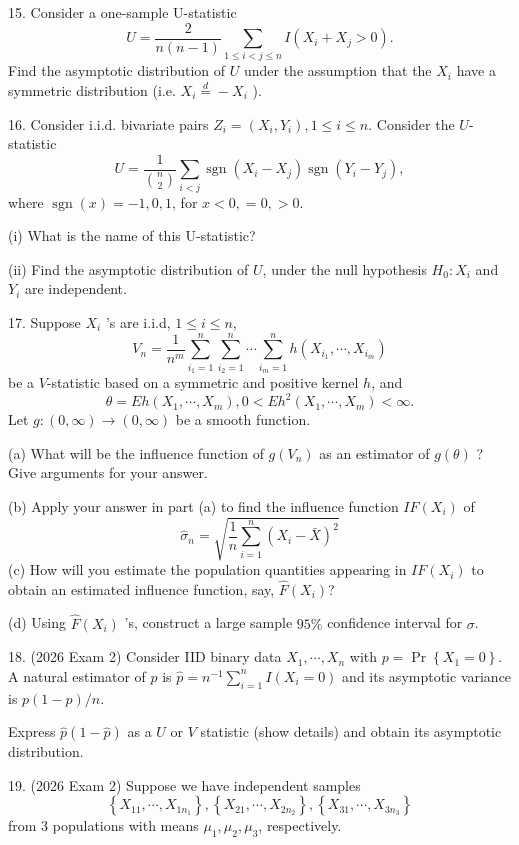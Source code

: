 \documentclass[11pt]{article}
\theoremstyle{definition}
\begin{document}
15. Consider a one-sample U-statistic
$$
U=\frac{2}{n(n-1)} \sum_{1 \leq i<j \leq n} I\left(X_i+X_j>0\right) .
$$
Find the asymptotic distribution of $U$ under the assumption that the $X_i$ have a symmetric distribution (i.e. $X_i \stackrel{d}{=}-X_i$ ).

16. Consider i.i.d. bivariate pairs $Z_i=\left(X_i, Y_i\right), 1 \leq i \leq n$. Consider the $U$-statistic
$$
U=\frac{1}{\binom{n}{2}} \sum_{i<j} \operatorname{sgn}\left(X_i-X_j\right) \operatorname{sgn}\left(Y_i-Y_j\right),
$$
where $\operatorname{sgn}(x)=-1,0,1$, for $x<0,=0,>0$.

(i) What is the name of this U-statistic?

(ii) Find the asymptotic distribution of $U$, under the null hypothesis $H_0: X_i$ and $Y_i$ are independent.

17. Suppose $X_i$ 's are i.i.d, $1 \leq i \leq n$,
$$
V_n=\frac{1}{n^m} \sum_{i_1=1}^n \sum_{i_2=1}^n \cdots \sum_{i_m=1}^n h\left(X_{i_1}, \cdots, X_{i_m}\right)
$$
be a $V$-statistic based on a symmetric and positive kernel $h$, and
$$
\theta=E h\left(X_1, \cdots, X_m\right), 0<E h^2\left(X_1, \cdots, X_m\right)<\infty .
$$
Let $g:(0, \infty) \rightarrow(0, \infty)$ be a smooth function.

(a) What will be the influence function of $g\left(V_n\right)$ as an estimator of $g(\theta)$ ? Give arguments for your answer.

(b) Apply your answer in part (a) to find the influence function $I F\left(X_i\right)$ of
$$
\widehat{\sigma}_n=\sqrt{\frac{1}{n} \sum_{i=1}^n\left(X_i-\bar{X}\right)^2}
$$
(c) How will you estimate the population quantities appearing in $I F\left(X_i\right)$ to obtain an estimated influence function, say, $\widehat{F}\left(X_i\right)$?

(d) Using $\widehat{F}\left(X_i\right)$ 's, construct a large sample $95 \%$ confidence interval for $\sigma$.

18. (2026 Exam 2) Consider IID binary data $X_1, \cdots, X_n$ with $p=\operatorname{Pr}\left\{X_1=0\right\}$.
A natural estimator of $p$ is $\widehat{p}=n^{-1} \sum_{i=1}^n I\left(X_i=0\right)$ and its asymptotic variance is $p(1-p) / n$. 

Express $\widehat{p}(1-\widehat{p})$ as a $U$ or $V$ statistic (show details) and obtain its asymptotic distribution.

19. (2026 Exam 2) Suppose we have independent samples 
$$
\left\{X_{11}, \cdots, X_{1 n_1}\right\},\left\{X_{21}, \cdots, X_{2 n_2}\right\},\left\{X_{31}, \cdots, X_{3 n_3}\right\}
$$ 
from 3 populations with means $\mu_1, \mu_2, \mu_3$, respectively.
\end{document}
